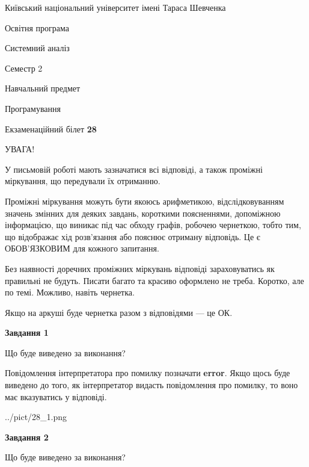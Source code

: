 \documentclass[12pt, ukrainian]{article}
\begin{document}
{{\begin {small}\par
{ \center  Київський національний університет імені Тараса Шевченка \par}
{\parbox {5 cm}{Освітня програма \hfill}{\parbox {7 cm}{Системний аналіз \hfill}}\parbox {6 cm}{\hfill Семестр 2}}\par
{\parbox {5 cm} {Навчальний предмет \hfill}\parbox {7 cm}{Програмування \hfill}\parbox {6cm}{\hfill}\par}\vspace{-7pt} \end{small}}{\center Екзаменаційний білет \No \textbf
{ 28 }\par}}
{
\begin {large}
УВАГА!

У письмовій роботі мають зазначатися всі відповіді, а також проміжні міркування, що передували їх отриманню.

Проміжні міркування можуть бути якоюсь арифметикою, відслідковуванням зна\-чень змінних для деяких завдань,
короткими поясненнями, допоміжною інформацією, що виникає під час обходу графів, робочею чернеткою,
тобто тим, що відображає хід розв’язання або пояснює отриману відповідь.
Це є ОБОВ’ЯЗКОВИМ для кожного запитання.

Без наявності доречних проміжних міркувань відповіді зараховуватись як правиль\-ні не будуть.
Писати багато та красиво оформлено не треба. Коротко, але по темі. Можли\-во, навіть чернетка.

Якщо на аркуші буде чернетка разом з відповідями --- це ОК.

\newpage

{\begin {center}\textbf{Завдання 1}\end {center}}\par
Що буде виведено за виконання?

Повідомлення інтерпретатора про помилку позначати \textbf{error}.
Якщо щось буде виведено до того, як інтерпретатор видасть повідомлення про помилку, 
то воно має вказуватись у відповіді. \par


\begin{center}
	{../pict/28_1.png}
\end{center}
\newpage

{\begin {center}\textbf{Завдання 2}\end {center}}\par
Що буде виведено за виконання?


\end{large}}
\end{document}
